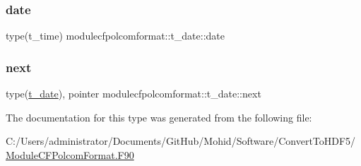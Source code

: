 \subsubsection{\texorpdfstring{date}{date}}
{\footnotesize\ttfamily type(t\+\_\+time) modulecfpolcomformat\+::t\+\_\+date\+::date\hspace{0.3cm}{\ttfamily [private]}}

\mbox{\label{structmodulecfpolcomformat_1_1t__date_a72b9d474b31aefa54b671131f6034a72}} 
\subsubsection{\texorpdfstring{next}{next}}
{\footnotesize\ttfamily type(\mbox{\hyperlink{structmodulecfpolcomformat_1_1t__date}{t\+\_\+date}}), pointer modulecfpolcomformat\+::t\+\_\+date\+::next\hspace{0.3cm}{\ttfamily [private]}}



The documentation for this type was generated from the following file\+:\begin{DoxyCompactItemize}
\item 
C\+:/\+Users/administrator/\+Documents/\+Git\+Hub/\+Mohid/\+Software/\+Convert\+To\+H\+D\+F5/\mbox{\hyperlink{_module_c_f_polcom_format_8_f90}{Module\+C\+F\+Polcom\+Format.\+F90}}\end{DoxyCompactItemize}

